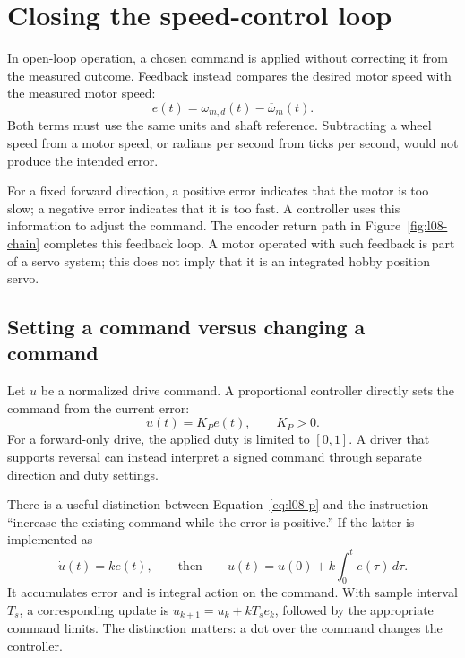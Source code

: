 \section{Closing the speed-control loop}
In open-loop operation, a chosen command is applied without correcting it
from the measured outcome. Feedback instead compares the desired motor
speed with the measured motor speed:
\begin{equation}
 e(t)=\omega_{m,d}(t)-\overline\omega_m(t).
 \label{eq:l08-error}
\end{equation}
Both terms must use the same units and shaft reference. Subtracting a wheel
speed from a motor speed, or radians per second from ticks per second,
would not produce the intended error.

For a fixed forward direction, a positive error indicates that the motor is
too slow; a negative error indicates that it is too fast. A controller uses
this information to adjust the command. The encoder return path in
Figure~\ref{fig:l08-chain} completes this feedback loop. A motor operated
with such feedback is part of a servo system; this does not imply that it is
an integrated hobby position servo.

\subsection{Setting a command versus changing a command}
Let $u$ be a normalized drive command. A proportional controller directly
sets the command from the current error:
\begin{equation}
 u(t)=K_P e(t),\qquad K_P>0.
 \label{eq:l08-p}
\end{equation}
For a forward-only drive, the applied duty is limited to $[0,1]$. A driver
that supports reversal can instead interpret a signed command through
separate direction and duty settings.

There is a useful distinction between Equation~\eqref{eq:l08-p} and the
instruction ``increase the existing command while the error is positive.''
If the latter is implemented as
\begin{equation}
 \dot u(t)=k e(t),
 \qquad\text{then}\qquad
 u(t)=u(0)+k\int_0^t e(\tau)\,d\tau.
 \label{eq:l08-incremental}
\end{equation}
It accumulates error and is integral action on the command. With sample
interval $T_s$, a corresponding update is
$u_{k+1}=u_k+kT_s e_k$, followed by the appropriate command limits.
The distinction matters: a dot over the command changes the controller.

